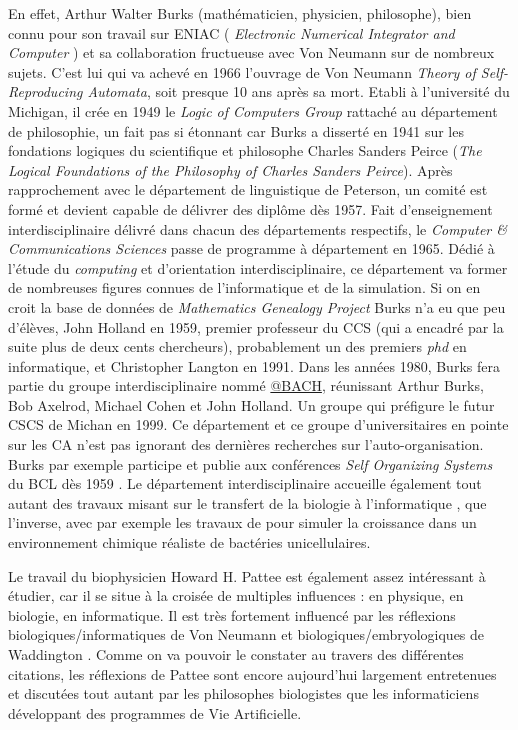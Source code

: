 En effet, Arthur Walter Burks (mathématicien, physicien, philosophe), bien connu pour son travail sur ENIAC ( \textit{Electronic Numerical Integrator and Computer} ) et sa collaboration fructueuse avec Von Neumann sur de nombreux sujets. C'est lui qui va achevé en 1966 l'ouvrage de Von Neumann \textit{Theory of Self-Reproducing Automata}, soit presque 10 ans après sa mort. Etabli à l'université du Michigan, il crée en 1949 le \textit{Logic of Computers Group} rattaché au département de philosophie, un fait pas si étonnant car Burks a disserté en 1941 sur les fondations logiques du scientifique et philosophe Charles Sanders Peirce (\textit{The Logical Foundations of the Philosophy of Charles Sanders Peirce}). Après rapprochement avec le département de linguistique de Peterson, un comité est formé et devient capable de délivrer des diplôme dès 1957. Fait d'enseignement interdisciplinaire délivré dans chacun des départements respectifs, le \textit{Computer \& Communications Sciences} passe de programme à département en 1965. Dédié à l'étude du \textit{computing} et d'orientation interdisciplinaire, ce département va former de nombreuses figures connues de l'informatique et de la simulation. Si on en croit la base de données de \textit{Mathematics Genealogy Project} Burks n'a eu que peu d'élèves, John Holland en 1959, premier professeur du CCS (qui a encadré par la suite plus de deux cents chercheurs), probablement un des premiers \textit{phd} en informatique, et Christopher Langton en 1991. Dans les années 1980, Burks fera partie du groupe interdisciplinaire nommé \href{http://www.lsa.umich.edu/cscs/aboutus/bachgroup}{@BACH}, réunissant Arthur Burks, Bob Axelrod, Michael Cohen et John Holland. Un groupe qui préfigure le futur CSCS de Michan en 1999. Ce département et ce groupe d'universitaires en pointe sur les CA n'est pas ignorant des dernières recherches sur l'auto-organisation. Burks par exemple participe et publie aux conférences \textit{Self Organizing Systems} du BCL dès 1959 \autocite{Yovits1960}. Le département interdisciplinaire accueille également tout autant des travaux misant sur le transfert de la biologie à l'informatique \autocite{Holland1976}, que l'inverse, avec par exemple les travaux de \textcites{Weinberg1969, Weinberg1970, Weinberg1971} pour simuler la croissance dans un environnement chimique réaliste de bactéries unicellulaires.

Le travail du biophysicien Howard H. Pattee est également assez intéressant à étudier, car il se situe à la croisée de multiples influences : en physique, en biologie, en informatique. Il est très fortement influencé par les réflexions biologiques/informatiques de Von Neumann et biologiques/embryologiques de Waddington \autocite{Pattee2001, Umerez2001}. Comme on va pouvoir le constater au travers des différentes citations, les réflexions de Pattee sont encore aujourd'hui largement entretenues et discutées tout autant par les philosophes biologistes que les informaticiens développant des programmes de Vie Artificielle. 

